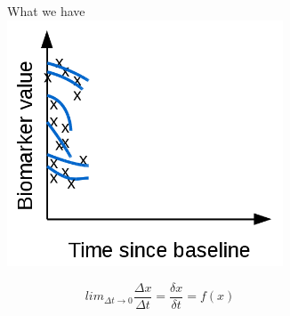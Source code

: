 \documentclass[8pt,xcolor=table]{beamer}
\begin{document}
\begin{frame}
\begin{figure}[H]
\begin{subfigure}{0.3\textwidth}
     \vspace{1em}
 \end{subfigure}
 \begin{subfigure}{0.3\textwidth}
     \centering
     What we have\\
     \vspace{1em}
     \includegraphics[width=0.90\textwidth,trim= 0 0 0 30]{demNewFigs/fig3.png}
     \vspace{1em}
 \end{subfigure}
 
  \begin{subfigure}{0.3\textwidth}
  \centering
  $$
  lim_{\Delta t \xrightarrow{}  0} \frac{\Delta x}{\Delta t} = \frac{\delta x}{\delta t} = f(x)
  $$
  

\end{subfigure}
\end{figure}
\end{frame}
\end{document}
